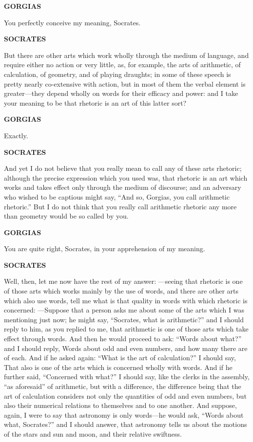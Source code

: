 \documentclass[11pt,letter]{article}
\begin{document}
\par \textbf{GORGIAS}
\par   You perfectly conceive my meaning, Socrates.

\par \textbf{SOCRATES}
\par   But there are other arts which work wholly through the medium of language, and require either no action or very little, as, for example, the arts of arithmetic, of calculation, of geometry, and of playing draughts; in some of these speech is pretty nearly co-extensive with action, but in most of them the verbal element is greater—they depend wholly on words for their efficacy and power:  and I take your meaning to be that rhetoric is an art of this latter sort?

\par \textbf{GORGIAS}
\par   Exactly.

\par \textbf{SOCRATES}
\par   And yet I do not believe that you really mean to call any of these arts rhetoric; although the precise expression which you used was, that rhetoric is an art which works and takes effect only through the medium of discourse; and an adversary who wished to be captious might say, “And so, Gorgias, you call arithmetic rhetoric.” But I do not think that you really call arithmetic rhetoric any more than geometry would be so called by you.

\par \textbf{GORGIAS}
\par   You are quite right, Socrates, in your apprehension of my meaning.

\par \textbf{SOCRATES}
\par   Well, then, let me now have the rest of my answer: —seeing that rhetoric is one of those arts which works mainly by the use of words, and there are other arts which also use words, tell me what is that quality in words with which rhetoric is concerned: —Suppose that a person asks me about some of the arts which I was mentioning just now; he might say, “Socrates, what is arithmetic?” and I should reply to him, as you replied to me, that arithmetic is one of those arts which take effect through words. And then he would proceed to ask:  “Words about what?” and I should reply, Words about odd and even numbers, and how many there are of each. And if he asked again:  “What is the art of calculation?” I should say, That also is one of the arts which is concerned wholly with words. And if he further said, “Concerned with what?” I should say, like the clerks in the assembly, “as aforesaid” of arithmetic, but with a difference, the difference being that the art of calculation considers not only the quantities of odd and even numbers, but also their numerical relations to themselves and to one another. And suppose, again, I were to say that astronomy is only words—he would ask, “Words about what, Socrates?” and I should answer, that astronomy tells us about the motions of the stars and sun and moon, and their relative swiftness.
\end{document}
